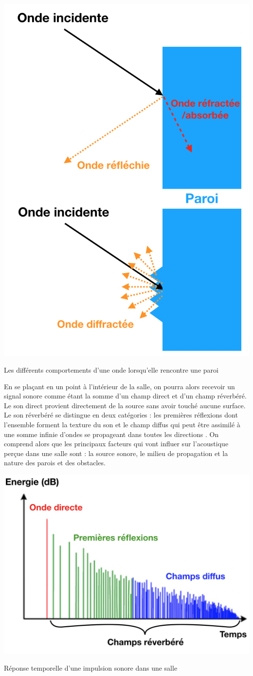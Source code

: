 \begin{figureth}
	\includegraphics[width=0.5\linewidth]{images/schema_absorption}
	\caption[Les différents comportements d'une onde lorsqu'elle rencontre une paroi]{Les différents comportements d'une onde lorsqu'elle rencontre une paroi} %
	\label{schema_absorption}
\end{figureth}

En se plaçant en un point à l'intérieur de la salle, on pourra alors recevoir un signal sonore comme étant la somme d'un champ direct et d’un champ réverbéré. Le son direct provient directement de la source sans avoir touché aucune surface. Le son réverbéré se distingue en deux catégories : les premières réflexions dont l'ensemble forment la texture du son et le champ diffus qui peut être assimilé à une somme infinie d'ondes se propageant dans toutes les directions \cite[p. 9]{jouhaneau}.
On comprend alors que les principaux facteurs qui vont influer sur l'acoustique perçue dans une salle sont : la source sonore, le milieu de propagation et la nature des parois et des obstacles.

\begin{figureth}
	\includegraphics[width=0.7\linewidth]{images/RIR_schematique}
	\caption{Réponse temporelle d'une impulsion sonore dans une salle}
	\label{RIR_schematique}
\end{figureth}


